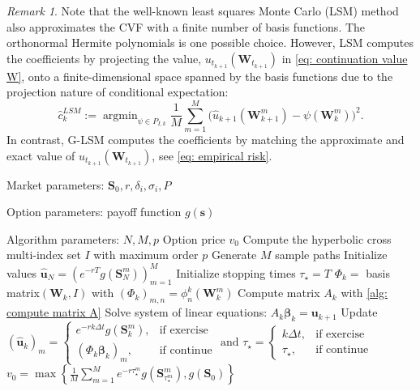\documentclass[10pt,a4paper]{amsart}
\numberwithin{equation}{section}
\numberwithin{algorithm}{section}
\theoremstyle{plain}
\theoremstyle{remark}
\newtheorem{remark}[remark]{Remark}
\DeclareMathOperator*{\argmin}{argmin}
\begin{document}
\begin{remark}
Note that the well-known least squares Monte Carlo (LSM) method  \cite{longstaff2001valuing, tsitsiklis2001regression} also approximates the CVF with a finite number of basis functions. The orthonormal Hermite polynomials is one possible choice. However, LSM computes the coefficients by projecting the value, $u_{t_{k+1}}(\mathbf{W}_{t_{k+1}})$ in \cref{eq: continuation value W}, onto a finite-dimensional space spanned by the basis functions due to the projection nature of conditional expectation:
\begin{equation*}
    \hat{c}_k^{LSM} := \argmin_{\psi \in P_{I,k}}
    \frac{1}{M}\sum_{m=1}^M
    \big(\hat{u}_{k+1}(\mathbf{W}^m_{k+1}) -
    \psi(\mathbf{W}^m_k) \big)^2.
\end{equation*}
In contrast, G-LSM computes the coefficients by matching the approximate and exact value of $u_{t_{k+1}}(\mathbf{W}_{t_{k+1}})$, see \cref{eq: empirical risk}. 
\end{remark}

\begin{algorithm}[htbp]
\caption{G-LSM}
\label{alg: sparse hermite polynomial expansions}
\begin{algorithmic}[1]
\REQUIRE Market parameters: $ \mathbf{S}_0, r, \delta_i, \sigma_i, P $ \par
        Option parameters: payoff function $g(\mathbf{s})$ \par
        Algorithm parameters: $N, M, p$
\ENSURE Option price $v_0$
\STATE Compute the hyperbolic cross multi-index set $I$ with maximum order $p$ 
\STATE Generate $M$ sample paths
\STATE Initialize values $\mathbf{\hat{u}}_N = (e^{-rT}g(\mathbf{S}_N^m))_{m=1}^M$
\STATE Initialize stopping times $\tau_\star = T$
    \STATE $\Phi_k = $ basis matrix$(\mathbf{W}_k, I)$ with $(\Phi_k)_{m,n} = \phi_n^k(\mathbf{W}_k^m)$
    \STATE Compute matrix $A_k$ with \cref{alg: compute matrix A}
    \STATE Solve system of linear equations: $A_k\bm{\beta}_k = \mathbf{u}_{k+1}$
    \STATE Update $(\mathbf{\hat{u}}_{k})_m = \begin{cases}
        e^{-rk\Delta t} g(\mathbf{S}^m_k), &\text{if exercise} \\
        (\Phi_k \bm{\beta}_k)_m, &\text{if continue}
    \end{cases}
    \text{ and }
    \tau_\star = \begin{cases}
        k\Delta t,  &\text{if exercise} \\
        \tau_\star, &\text{if continue}
    \end{cases}$
\ENDFOR
\STATE $v_0 = \max\left\{\frac{1}{M} \sum_{m=1}^M e^{-r\tau_\star^m} g(\mathbf{S}^m_{\tau_\star^m}),g(\mathbf{S}_0)\right\}$
\end{algorithmic}
\end{algorithm}
\end{document}
